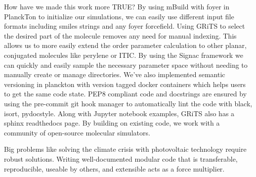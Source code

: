 How have we made this work more TRUE?
By using mBuild with foyer in PlanckTon to initialize our simulations, we can easily use different input file formats including smiles strings and any foyer forcefield. 
Using GRiTS to select the desired part of the molecule removes any need for manual indexing. This allows us to more easily extend the order parameter calculation to other planar, conjugated molecules like perylene or ITIC.
By using the Signac framework we can quickly and easily sample the necessary parameter space without needing to manually create or manage directories. 
We've also implemented semantic versioning in planckton with version tagged docker containers which helps users to get the same code state.
PEP8 compliant code and docstrings are ensured by using the pre-commit git hook manager to automatically lint the code with black, isort, pydocstyle.
Along with Jupyter notebook examples, GRiTS also has a sphinx readthedocs page.
By building on existing code, we work with a community of open-source molecular simulators. 

%
Big problems like solving the climate crisis with photovoltaic technology require robust solutions. 
Writing well-documented modular code that is transferable, reproducible, useable by others, and extensible acts as a force multiplier.


